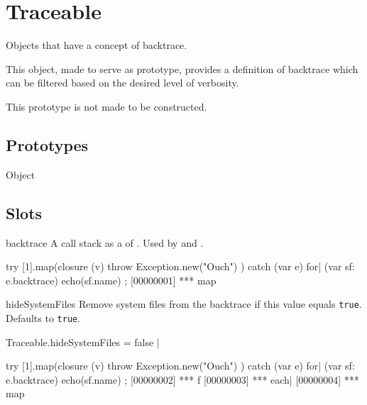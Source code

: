 
\section{Traceable}
Objects that have a concept of backtrace.

This object, made to serve as prototype, provides a definition of backtrace
which can be filtered based on the desired level of verbosity.

This prototype is not made to be constructed.

\subsection{Prototypes}
\begin{refObjects}
\item[Object]
\end{refObjects}

\subsection{Slots}

\begin{urbiscriptapi}
\item[backtrace] A call stack as a  of
  .  Used by  and
  .
\begin{urbiscript}
try
{
  [1].map(closure (v) { throw Exception.new("Ouch") })
}
catch (var e)
{
  for| (var sf: e.backtrace)
    echo(sf.name)
};
[00000001] *** map
\end{urbiscript}

\item[hideSystemFiles] Remove system files from the backtrace if this value
  equals \lstinline|true|.  Defaults to \lstinline|true|.
\begin{urbiscript}
Traceable.hideSystemFiles = false |

try
{
  [1].map(closure (v) { throw Exception.new("Ouch") })
}
catch (var e)
{
  for| (var sf: e.backtrace)
    echo(sf.name)
};
[00000002] *** f
[00000003] *** each|
[00000004] *** map
\end{urbiscript}

\end{urbiscriptapi}


